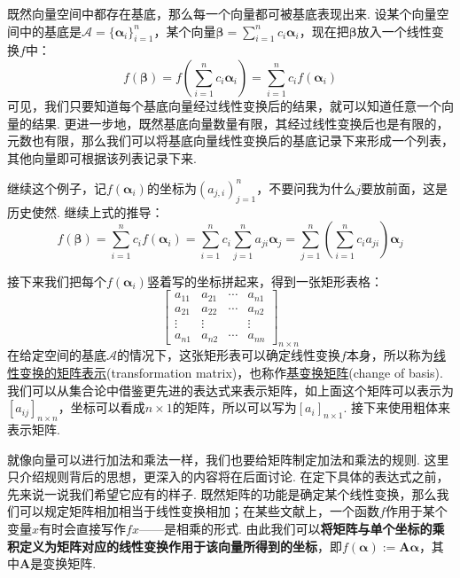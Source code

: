 \documentclass[main.tex]{subfiles}
\begin{document}
既然向量空间中都存在基底，那么每一个向量都可被基底表现出来. 设某个向量空间中的基底是\(\mathcal A = \{\bm\alpha_i\}_{i=1}^{n}\)，某个向量\(\displaystyle{\bm\beta = \sum_{i=1}^{n}c_i\bm\alpha_i}\)，现在把\(\bm\beta\)放入一个线性变换\(f\)中：
\[f(\bm\beta) = f\left(\sum_{i=1}^{n}c_i\bm\alpha_i\right) = \sum_{i=1}^{n}c_if(\bm\alpha_i)\]
可见，我们只要知道每个基底向量经过线性变换后的结果，就可以知道任意一个向量的结果. 更进一步地，既然基底向量数量有限，其经过线性变换后也是有限的，元数也有限，那么我们可以将基底向量线性变换后的基底记录下来形成一个列表，其他向量即可根据该列表记录下来.

继续这个例子，记\(f(\bm\alpha_i)\)的坐标为\((a_{j,i})_{j=1}^{n}\)，不要问我为什么\(j\)要放前面，这是历史使然. 继续上式的推导：
\begin{equation*}
    f(\bm\beta) = \sum_{i=1}^{n}c_if(\bm\alpha_i) = \sum_{i=1}^{n}c_i \sum_{j=1}^{n}a_{ji}\bm\alpha_j = \sum_{j=1}^{n} \left(\sum_{i=1}^{n}c_i a_{ji}\right)\bm\alpha_j \tag{*}
\end{equation*}

接下来我们把每个\(f(\bm\alpha_i)\)竖着写的坐标拼起来，得到一张矩形表格：
\[\left[\begin{array}{c|c|c|c}
    a_{11} & a_{21} & \cdots & a_{n1} \\
    a_{21} & a_{22} & \cdots & a_{n2} \\
    \vdots & \vdots & & \vdots \\
    a_{n1} & a_{n2} & \cdots & a_{nn}
\end{array}\right]_{n \times n}\]
在给定空间的基底\(\mathcal{A}\)的情况下，这张矩形表可以确定线性变换\(f\)本身，所以称为\uline{线性变换的矩阵表示}(transformation matrix)，也称作\uline{基变换矩阵}(change of basis). 我们可以从集合论中借鉴更先进的表达式来表示矩阵，如上面这个矩阵可以表示为\([a_{ij}]_{n \times n}\)，坐标可以看成\(n\times 1\)的矩阵，所以可以写为\([a_i]_{n \times 1}\). 接下来使用粗体来表示矩阵.

就像向量可以进行加法和乘法一样，我们也要给矩阵制定加法和乘法的规则. 这里只介绍规则背后的思想，更深入的内容将在后面讨论. 在定下具体的表达式之前，先来说一说我们希望它应有的样子. 既然矩阵的功能是确定某个线性变换，那么我们可以规定矩阵相加相当于线性变换相加；在某些文献上，一个函数\(f\)作用于某个变量\(x\)有时会直接写作\(fx\)——是相乘的形式. 由此我们可以\textbf{将矩阵与单个坐标的乘积定义为矩阵对应的线性变换作用于该向量所得到的坐标}，即\(f(\bm\alpha) := \bm A \bm\alpha\)，其中\(\bm A\)是变换矩阵.
\end{document}
